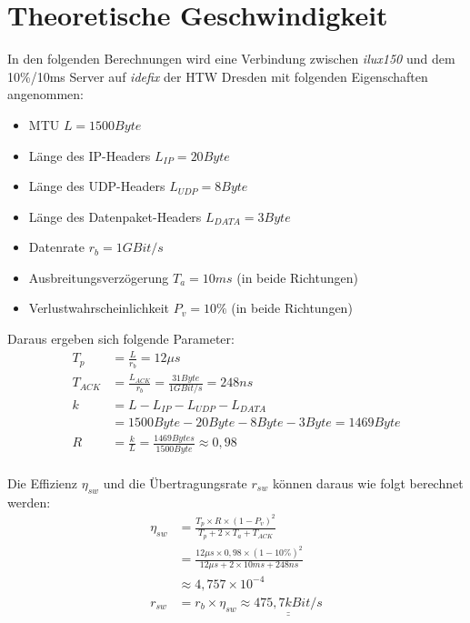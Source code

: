 \section{Theoretische Geschwindigkeit}

In den folgenden Berechnungen wird eine Verbindung zwischen \textit{ilux150} und dem 10\%/10ms Server auf \textit{idefix} der HTW Dresden mit folgenden Eigenschaften angenommen:
\begin{itemize}
	\item MTU \(L = 1500Byte\)
	\item Länge des IP-Headers \(L_{IP} = 20Byte\)
	\item Länge des UDP-Headers \(L_{UDP} = 8Byte\)
	\item Länge des Datenpaket-Headers \(L_{DATA} = 3Byte\)
	\item Datenrate \(r_{b} = 1 GBit/s\)
	\item Ausbreitungsverzögerung \(T_{a} = 10ms\) (in beide Richtungen)
	\item Verlustwahrscheinlichkeit \(P_{v} = 10\%\) (in beide Richtungen)
\end{itemize}

\newpage

\noindent
Daraus ergeben sich folgende Parameter:
\begin{align*}
	T_{p}   & = \frac{L}{r_{b}} = 12\mu s                              \\
	T_{ACK} & = \frac{L_{ACK}}{r_{b}} = \frac{31Byte}{1GBit/s} = 248ns \\
	k       & = L - L_{IP} - L_{UDP} - L_{DATA}                        \\
	        & = 1500Byte - 20Byte - 8Byte - 3Byte = 1469Byte           \\
	R       & = \frac{k}{L} = \frac{1469Bytes}{1500Byte} \approx 0,98  \\
\end{align*}

\noindent
Die Effizienz \(\eta_{sw}\) und die Übertragungsrate \(r_{sw}\) können daraus wie folgt berechnet werden:
\begin{align*}
	\eta_{sw} & = \frac{T_{p} \times R \times (1 - P_{v})^2}{T_{p} + 2 \times T_{a} + T_{ACK}}    \\
	          & = \frac{12\mu s \times 0,98 \times (1 - 10\%)^2}{12\mu s + 2 \times 10ms + 248ns} \\
	          & \approx 4,757 \times 10^{-4}                                                      \\
	r_{sw}    & = r_{b} \times \eta_{sw} \approx \underline{\underline{475,7kBit/s}}              \\
\end{align*}

